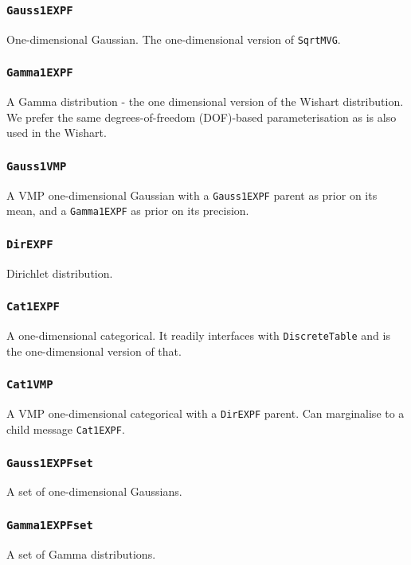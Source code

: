 \documentclass[english]{article}
\begin{document}
\subsubsection{\texttt{Gauss1EXPF}}
One-dimensional Gaussian. The one-dimensional version of \texttt{SqrtMVG}.

\subsubsection{\texttt{Gamma1EXPF}}
A Gamma distribution - the one dimensional version of the Wishart
distribution. We prefer the same degrees-of-freedom (DOF)-based
parameterisation as is also used in the Wishart.

\subsubsection{\texttt{Gauss1VMP}}
A VMP one-dimensional Gaussian with a \texttt{Gauss1EXPF} parent as
 prior on its mean, and a \texttt{Gamma1EXPF} as prior on its
 precision.

\subsubsection{\texttt{DirEXPF}}
Dirichlet distribution.

\subsubsection{\texttt{Cat1EXPF}}
A one-dimensional categorical. It readily interfaces with
\texttt{DiscreteTable} and is the one-dimensional version of that.

\subsubsection{\texttt{Cat1VMP}}
A VMP one-dimensional categorical with a \texttt{DirEXPF} parent. Can
 marginalise to a child message \texttt{Cat1EXPF}.

\subsubsection{\texttt{Gauss1EXPFset}}
A set of one-dimensional Gaussians.

\subsubsection{\texttt{Gamma1EXPFset}}
A set of Gamma distributions.
\end{document}
